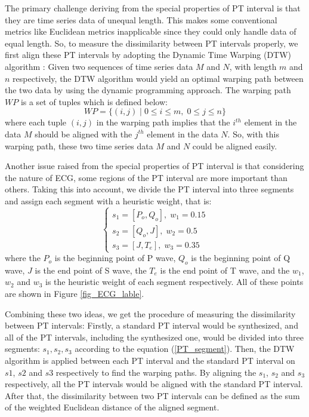 \documentclass[conference]{IEEEtran}
\begin{document}
The primary challenge deriving from the special properties of PT interval is that they are time series data of unequal length. This makes some conventional metrics like Euclidean metrics inapplicable since they could only handle data of equal length. So, to measure the dissimilarity between PT intervals properly, we first align these PT intervals by adopting the Dynamic Time Warping (DTW) algorithm \cite{sakoe1978dynamic}: Given two sequences of time series data $ M $ and $ N $, with length $ m $ and $ n $ respectively, the DTW algorithm would yield an optimal warping path between the two data by using the dynamic programming approach. The warping path $  WP $ is a set of tuples which is defined below:
\begin{equation}
WP = \{ (i, j) \; | \; 0 \leq i \leq m, \; 0 \leq j \leq n  \}
\end{equation}
where each tuple $ (i, j) $ in the warping path implies that the $ i^{th} $ element in the data $ M $ should be aligned with the $ j^{th} $ element in the data $ N $. So, with this warping path, these two time series data $ M $ and $ N $ could be aligned easily.


Another issue raised from the special properties of PT interval is that considering the nature of ECG, some regions of the PT interval are more important than others. Taking this into account, we divide the PT interval into three segments and assign each segment with a heuristic weight, that is:
\begin{equation}\label{PT_segment}
\left\{ \begin{array}{ll}
s_1 = [P_o, Q_o], \; w_1 = 0.15\\
s_2 = [Q_o, J], \;  w_2 = 0.5\\
s_3 = [J, T_e], \; w_3 = 0.35
\end{array} \right.
\end{equation}
where the $ P_o $ is the beginning point of P wave, $ Q_o $ is the beginning point of Q wave, $ J $ is the end point of S wave, the $ T_e $ is the end point of T wave, and the $ w_1 $, $ w_2 $ and $ w_3 $ is the heuristic weight of each segment respectively. All of these points are shown in Figure \ref{fig_ECG_lable}.


Combining these two ideas, we get the procedure of measuring the dissimilarity between PT intervals: Firstly, a standard PT interval would be synthesized, and all of the PT intervals, including the synthesized one, would be divided into three segments: $ s_1, s_2, s_3 $ according to the equation (\ref{PT_segment}). Then, the DTW algorithm is applied between each PT interval and the standard PT interval on $ s1 $, $ s2 $ and $ s3 $ respectively to find the warping paths. By aligning the $ s_1 $, $ s_2 $ and $ s_3 $ respectively, all the PT intervals would be aligned with the standard PT interval. After that, the dissimilarity between two PT intervals can be defined as the sum of the weighted Euclidean distance of the aligned segment. 
\end{document}
